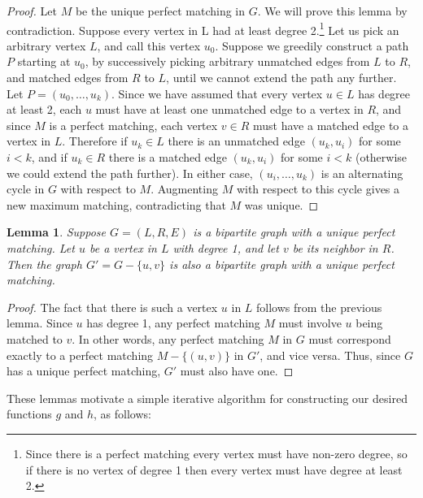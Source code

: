 \documentclass{hmcpset}
\newtheorem{lemma}{Lemma}
\begin{document}
\begin{solution}
\begin{enumerate}[label=(\Alph*)]
\begin{proof}
  Let $M$ be the unique perfect matching in $G$. We will prove this lemma
  by contradiction. Suppose every vertex in L had at least
  degree 2.\footnote{
      Since there is a perfect matching every vertex must have non-zero degree,
      so if there is no vertex of degree 1 then every vertex must have degree
      at least 2.}
  Let us pick an arbitrary vertex $L$, and call this vertex $u_0$.
  Suppose we greedily construct a path $P$ starting at $u_0$, by successively picking
  arbitrary unmatched edges from $L$ to $R$, and matched edges from $R$ to $L$, until
  we cannot extend the path any further. Let $P = (u_0,\ldots,u_k)$.
  Since we have assumed that every vertex $u \in L$ has degree at least 2, each $u$
  must have at least one unmatched edge to a vertex in $R$, and since $M$ is a
  perfect matching, each vertex $v \in R$ must have a matched edge to a vertex in $L$.
  Therefore if $u_k \in L$ there is an unmatched edge
  $(u_k, u_i)$ for some $i < k$, and if $u_k \in R$ there is a matched edge
  $(u_k, u_i)$ for some $i < k$ (otherwise we could extend the path further).
  In either case, $(u_i,\ldots,u_k)$ is an alternating cycle in $G$ with respect
  to $M$. Augmenting $M$ with respect to this cycle gives a new maximum matching,
  contradicting that $M$ was unique.
\end{proof}

\begin{lemma}
  Suppose $G = (L, R, E)$ is a bipartite graph with a unique perfect matching. Let
  $u$ be a vertex in $L$ with degree 1, and let $v$ be its neighbor in $R$. Then
  the graph $G' = G - \{u, v\}$ is also a bipartite graph
  with a unique perfect matching.
\end{lemma}

\begin{proof}
  The fact that there is such a vertex $u$ in $L$ follows from the previous lemma.
  Since $u$ has degree 1, any perfect matching $M$ must involve $u$ being matched
  to $v$. In other words, any perfect matching $M$ in $G$ must correspond exactly to
  a perfect matching $M - \{(u, v)\}$ in $G'$, and vice versa. Thus, since $G$ has a
  unique perfect matching, $G'$ must also have one.
\end{proof}

These lemmas motivate a simple iterative algorithm for constructing our desired
functions $g$ and $h$, as follows:


\end{enumerate}
\end{solution}
\end{document}
